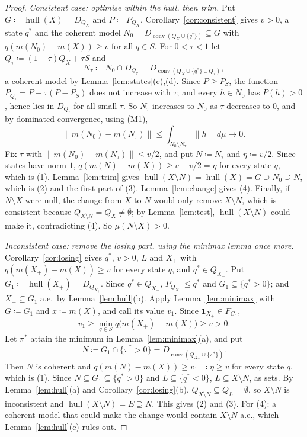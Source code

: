 \documentclass[11pt]{article}
\newcommand{\one}{\mathbf{1}}
\newcommand{\hull}{\operatorname{hull}}
\DeclareMathOperator{\conv}{conv}
\theoremstyle{plain}
\theoremstyle{definition}
\theoremstyle{remark}
\begin{document}
\begin{proof}
\emph{Consistent case: optimise within the hull, then trim.} Put $G\coloneqq\hull(X)=D_{Q_X}$
and $P\coloneqq P_{Q_X}$. Corollary~\ref{cor:consistent} gives $v>0$, a state $q^\ast$ and the
coherent model $N_0=D_{\conv(Q_X\cup\{q^\ast\})}\subseteq G$ with $q(m(N_0)-m(X))\ge v$ for all
$q\in S$. For $0<\tau<1$ let $Q_\tau\coloneqq(1-\tau)Q_X+\tau S$ and
\[
  N_\tau\coloneqq N_0\cap D_{Q_\tau}=D_{\conv(Q_X\cup\{q^\ast\}\cup Q_\tau)},
\]
a coherent model by Lemma~\ref{lem:states}(c),(d). Since $P\ge P_S$, the function
$P_{Q_\tau}=P-\tau(P-P_S)$ does not increase with $\tau$; and every $h\in N_0$ has $P(h)>0$,
hence lies in $D_{Q_\tau}$ for all small $\tau$. So $N_\tau$ increases to $N_0$ as $\tau$
decreases to $0$, and by dominated convergence, using (M1),
\[
  \|m(N_0)-m(N_\tau)\|\le\int_{N_0\setminus N_\tau}\|h\|\,d\mu\to0 .
\]
Fix $\tau$ with $\|m(N_0)-m(N_\tau)\|\le v/2$, and put $N\coloneqq N_\tau$ and $\eta\coloneqq
v/2$. Since states have norm $1$, $q(m(N)-m(X))\ge v-v/2=\eta$ for every state $q$, which is
(1). Lemma~\ref{lem:trim} gives $\hull(X\setminus N)=\hull(X)=G\supseteq N_0\supseteq N$, which
is (2) and the first part of (3). Lemma~\ref{lem:change} gives (4). Finally, if $N\setminus X$
were null, the change from $X$ to $N$ would only remove $X\setminus N$, which is consistent
because $Q_{X\setminus N}=Q_X\ne\emptyset$; by Lemma~\ref{lem:test}, $\hull(X\setminus N)$ could
make it, contradicting (4). So $\mu(N\setminus X)>0$.

\emph{Inconsistent case: remove the losing part, using the minimax lemma once more.}
Corollary~\ref{cor:losing} gives $q^\ast$, $v>0$, $L$ and $X_+$ with $q(m(X_+)-m(X))\ge v$ for
every state $q$, and $q^\ast\in Q_{X_+}$. Put $G_1\coloneqq\hull(X_+)=D_{Q_{X_+}}$. Since
$q^\ast\in Q_{X_+}$, $P_{Q_{X_+}}\le q^\ast$ and $G_1\subseteq\{q^\ast>0\}$; and $X_+\subseteq
G_1$ a.e.\ by Lemma~\ref{lem:hull}(b). Apply Lemma~\ref{lem:minimax} with $G\coloneqq G_1$ and
$x\coloneqq m(X)$, and call its value $v_1$. Since $\one_{X_+}\in F_{G_1}$,
\[
  v_1\ge\min_{q\in S}q\bigl(m(X_+)-m(X)\bigr)\ge v>0 .
\]
Let $\pi^\ast$ attain the minimum in Lemma~\ref{lem:minimax}(a), and put
\[
  N\coloneqq G_1\cap\{\pi^\ast>0\}=D_{\conv(Q_{X_+}\cup\{\pi^\ast\})} .
\]
Then $N$ is coherent and $q(m(N)-m(X))\ge v_1\eqqcolon\eta\ge v$ for every state $q$, which is
(1). Since $N\subseteq G_1\subseteq\{q^\ast>0\}$ and $L\subseteq\{q^\ast<0\}$, $L\subseteq
X\setminus N$, as sets. By Lemma~\ref{lem:hull}(a) and Corollary~\ref{cor:losing}(b),
$Q_{X\setminus N}\subseteq Q_L=\emptyset$, so $X\setminus N$ is inconsistent and $\hull(X
\setminus N)=E\supseteq N$. This gives (2) and (3). For (4): a coherent model that could make
the change would contain $X\setminus N$ a.e., which Lemma~\ref{lem:hull}(c) rules out.
\end{proof}
\end{document}

